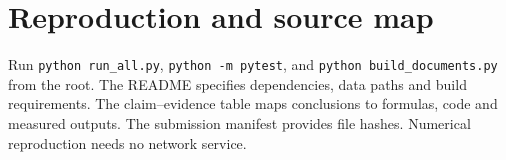 \section{Reproduction and source map}
Run \texttt{python run\_all.py}, \texttt{python -m pytest}, and \texttt{python build\_documents.py} from the root. The README specifies dependencies, data paths and build requirements. The claim--evidence table maps conclusions to formulas, code and measured outputs. The submission manifest provides file hashes. Numerical reproduction needs no network service.
